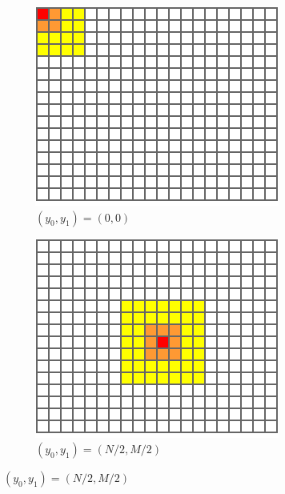 \begin{figure}
    \centering
    \begin{subfigure}[b]{0.3\textwidth}
        \centering
        \includegraphics[width=\textwidth]{fig/4/ca-cfar-window-1.pdf}
        \caption{$(y_0, y_1) = (0, 0)$}
    \end{subfigure}
    \hfill
    \begin{subfigure}[b]{0.3\textwidth}
        \centering
        \includegraphics[width=\textwidth]{fig/4/ca-cfar-window-2.pdf}
        \caption{$(y_0, y_1) = (N/2, M/2)$}
    \end{subfigure}

\end{figure}
